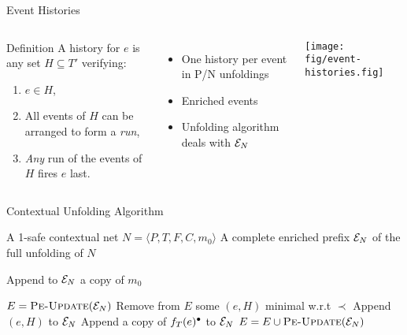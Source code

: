 \documentclass[table,red,11pt]{beamer}
\newcommand{\confl}{\ensuremath{\mathord{\#}}}
\newcommand{\peupdate}{\mbox{\sc Pe-Update}}
\newcommand{\iscutoff}{\mbox{\sc Is-Cutoff}}
\begin{document}
\begin{frame}{Event Histories}
\begin{columns}[T]

\begin{block}{Definition}
A \alert{history for $e$} is any set $H \subseteq T'$ verifying: 

\begin{enumerate}
\item $e \in H$,
\item All events of $H$ can be arranged to form a \emph{run},
\item \emph{Any} run of the events of $H$ fires $e$ last.
\end{enumerate}
\end{block}


\begin{itemize}
\item One history per event in P/N unfoldings
\item \alert{Enriched events}
\item Unfolding algorithm deals with $\mathcal{E}_{N}$
\end{itemize}

\texttt{[image: fig/event-histories.fig]}

\end{columns}
\end{frame}

\begin{frame}{Contextual Unfolding Algorithm}

\begin{algorithmic}
\REQUIRE A 1-safe contextual net $N = \langle P, T, F, C, m_0 \rangle$
\ENSURE A complete enriched prefix $\mathcal{E}_{N}$ of the full unfolding of $N$

\vspace{1ex}
\STATE Append to $\mathcal{E}_{N}$ a copy of $m_0$

\STATE $E = \peupdate (\enr N)$
\STATE Remove from $E$ some $(e, H)$ minimal w.r.t $\prec$
\IF{not $\iscutoff (e, H)$}
\STATE Append $(e, H)$ to $\mathcal{E}_{N}$
\STATE Append a copy of $f_T (e)^\bullet$ to $\mathcal{E}_{N}$
\STATE $E = E \cup \peupdate (\enr N)$
\ENDIF
\ENDWHILE
\end{algorithmic}
\end{frame}
\end{document}
